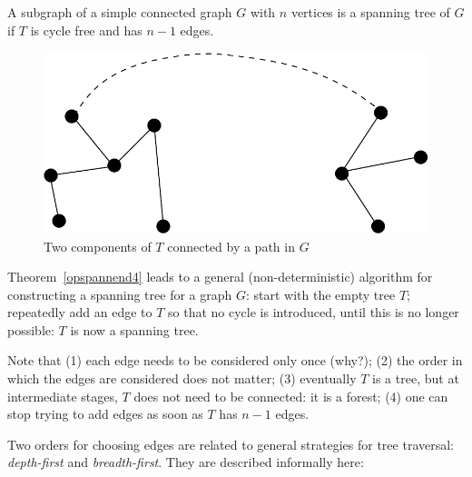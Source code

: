\begin{lemma}
A subgraph of a simple connected graph $G$ with $n$ vertices is a
spanning tree of $G$ if $T$ is cycle free and has $n-1$ edges.
\end{lemma}

\begin{figure}[ht]
\begin{center}
\includegraphics[width=0.3\linewidth,keepaspectratio]{opspannend3}
\end{center}
\caption{Two components of $T$ connected by a path in $G$
\label{opspannend3}}
\end{figure}

Theorem~\ref{opspannend4} leads to a general (non-deterministic)
algorithm for constructing a spanning tree for a graph $G$: start with
the empty tree $T$; repeatedly add an edge to $T$ so that no cycle is
introduced, until this is no longer possible: $T$ is now a spanning
tree.

Note that (1) each edge needs to be considered only once (why?); (2)
the order in which the edges are considered does not matter; (3)
eventually $T$ is a tree, but at intermediate stages, $T$ does not
need to be connected: it is a forest; (4) one can stop trying to add
edges as soon as $T$ has $n-1$ edges.

Two orders for choosing edges are related to general strategies for
tree traversal: {\em depth-first} and {\em breadth-first}. They are
described informally here:

